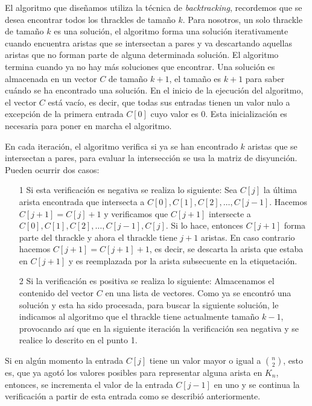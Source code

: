   El algoritmo que diseñamos utiliza la técnica de \emph{backtracking},
  recordemos que se desea encontrar todos los thrackles de tamaño $k$. Para
  nosotros, un solo thrackle de tamaño $k$ es una solución, el algoritmo forma
  una solución iterativamente cuando encuentra aristas que se intersectan a
  pares y va descartando aquellas aristas que no forman parte de alguna
  determinada solución. El algoritmo termina cuando ya no hay más soluciones
  que encontrar. Una solución es almacenada en un vector $C$ de tamaño $k+1$,
  el tamaño es $k+1$ para saber cuándo se ha encontrado una solución. En el
  inicio de la ejecución del algoritmo, el vector $C$ está vacío, es decir, que
  todas sus entradas tienen un valor nulo a excepción de la primera entrada
  $C[0]$ cuyo valor es 0. Esta inicialización es necesaria para poner en marcha
  el algoritmo.

  En cada iteración, el algoritmo verifica si ya se han encontrado $k$ aristas
  que se intersectan a pares, para evaluar la intersección se usa la matriz de
  disyunción. Pueden ocurrir dos casos:
  \begin{itemize}
    \item[1] Si esta verificación es negativa se realiza lo siguiente:
    Sea $C[j]$ la última arista encontrada que intersecta a $C[0],C[1],C[2],\dots,C[j-1]$. Hacemos $C[j+1]=C[j]+1$ y verificamos que $C[j+1]$ intersecte a $C[0],C[1],C[2],\dots,C[j-1],C[j]$.
    Si lo hace, entonces $C[j+1]$ forma parte del thrackle y ahora el thrackle tiene $j+1$ aristas. En caso contrario hacemos $C[j+1]=C[j+1]+1$, es decir, se descarta la arista que estaba en $C[j+1]$ y es reemplazada por la arista subsecuente en la etiquetación.
    \item[2] Si la verificación es positiva se realiza lo siguiente:
    Almacenamos el contenido del vector $C$ en una lista de vectores.
    Como ya se encontró una solución y esta ha sido procesada, para buscar la siguiente solución, le indicamos al algoritmo que el thrackle tiene actualmente tamaño $k-1$, provocando así que en la siguiente iteración la verificación sea negativa y se realice lo descrito en el punto 1.
  \end{itemize}
  Si en algún momento la entrada $C[j]$ tiene un valor mayor o igual a
  $\binom{n}{2}$, esto es, que ya agotó los valores posibles para representar
  alguna arista en $K_n$, entonces, se incrementa el valor de la entrada $C[j-1]$ en uno y se continua la verificación a partir de esta entrada como se describió anteriormente.

